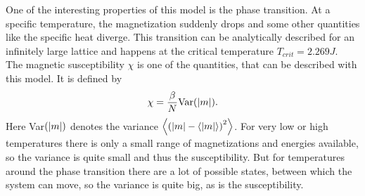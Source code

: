 One of the interesting properties of this model is the phase transition. At a specific temperature, the magnetization suddenly drops and some other quantities like the specific heat diverge. This transition can be analytically described for an infinitely large lattice and happens at the critical temperature $T_{crit} = 2.269 J$.\\
The magnetic susceptibility $\chi$ is one of the quantities, that can be described with this model. It is defined by
\begin{equation}
 \chi = \frac{\beta}{N} \text{Var}(\left\vert m \right\vert).
\end{equation}
Here Var$(\left\vert m \right\vert)$ denotes the variance $\left\langle{(\left\vert m \right\vert - \left\langle\left\vert m \right\vert\right\rangle)} ^2\right\rangle$. For very low or high temperatures there is only a small range of magnetizations and energies available, so the variance is quite small and thus the susceptibility. But for temperatures around the phase transition there are a lot of possible states, between which the system can move, so the variance is quite big, as is the susceptibility.
